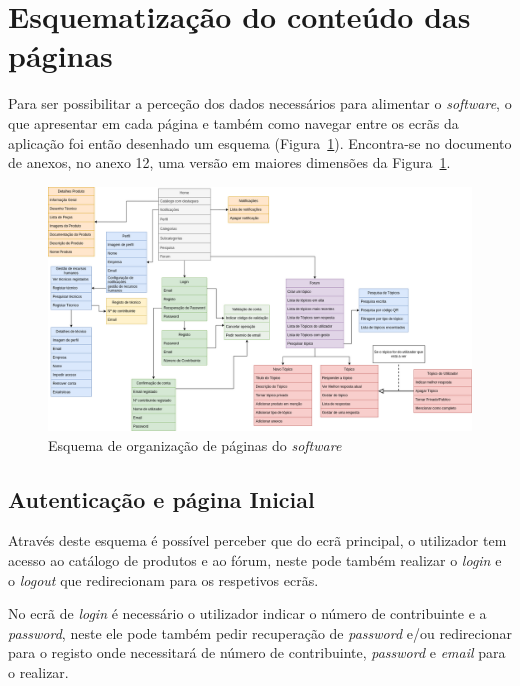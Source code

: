 \section{Esquematização do conteúdo das páginas}

Para ser possibilitar a perceção dos dados necessários para alimentar o \textit{software}, o que apresentar em cada página e também como navegar entre os ecrãs da aplicação foi então desenhado um esquema 
(Figura~\ref{fig:3}).  Encontra-se no documento de anexos, no anexo 12, uma versão em maiores dimensões da Figura~\ref*{fig:3}.

\begin{figure}[htb]
  \centering
  
  \includegraphics[width=\textwidth]{images/Arquiteturas/diagrama_superficial_de_aplicacao.png}
  \caption{Esquema de organização de páginas do \textit{software}}
  \label{fig:3}
\end{figure}

\newpage

\subsection{Autenticação e página Inicial}

Através deste esquema é possível perceber que do ecrã principal, o utilizador tem acesso ao 
catálogo de produtos e ao fórum, neste pode também realizar o \textit{login} e o \textit{logout} que redirecionam para os respetivos ecrãs.

No ecrã de \textit{login} é necessário o utilizador indicar o número de contribuinte e a \textit{password}, neste ele pode também pedir recuperação de \textit{password} e/ou redirecionar para o registo onde necessitará de número de contribuinte, \textit{password} e \textit{email} para o realizar.

